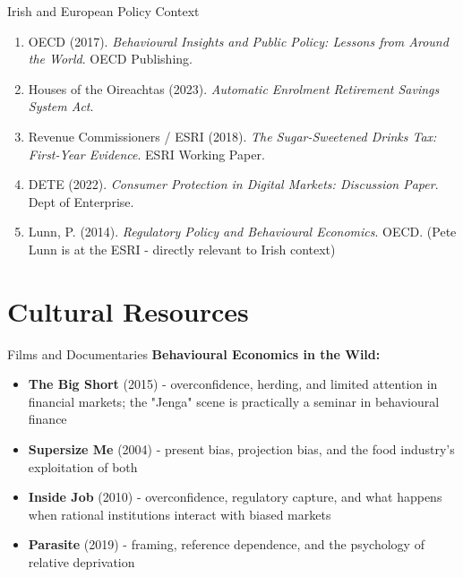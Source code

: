 \documentclass[10pt]{beamer}
\begin{document}
\begin{frame}{Irish and European Policy Context}
\footnotesize
\begin{enumerate}
\item OECD (2017). \emph{Behavioural Insights and Public Policy: Lessons from Around the World}. OECD Publishing.
\item Houses of the Oireachtas (2023). \emph{Automatic Enrolment Retirement Savings System Act}.
\item Revenue Commissioners / ESRI (2018). \emph{The Sugar-Sweetened Drinks Tax: First-Year Evidence}. ESRI Working Paper.
\item DETE (2022). \emph{Consumer Protection in Digital Markets: Discussion Paper}. Dept of Enterprise.
\item Lunn, P. (2014). \emph{Regulatory Policy and Behavioural Economics}. OECD. (Pete Lunn is at the ESRI - directly relevant to Irish context)
\end{enumerate}
\end{frame}

\section*{Cultural Resources}

\begin{frame}{Films and Documentaries}
\textbf{Behavioural Economics in the Wild:}
\begin{itemize}
\item \textbf{The Big Short} (2015) - overconfidence, herding, and limited attention in financial markets; the "Jenga" scene is practically a seminar in behavioural finance
\item \textbf{Supersize Me} (2004) - present bias, projection bias, and the food industry's exploitation of both
\item \textbf{Inside Job} (2010) - overconfidence, regulatory capture, and what happens when rational institutions interact with biased markets
\item \textbf{Parasite} (2019) - framing, reference dependence, and the psychology of relative deprivation
\end{itemize}
\end{frame}
\end{document}
